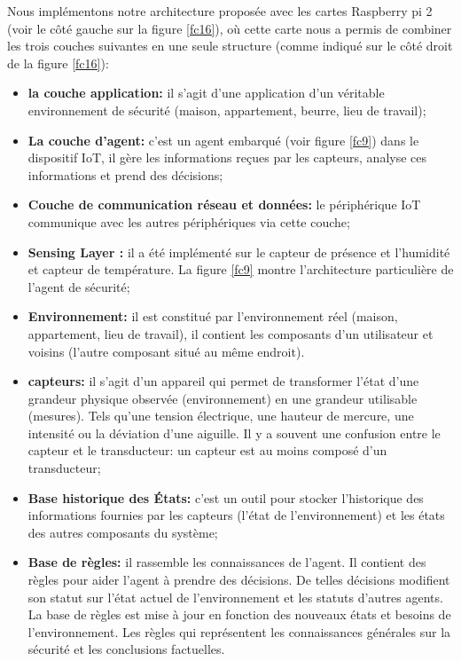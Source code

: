 Nous implémentons notre architecture proposée avec les cartes Raspberry pi 2 (voir le côté gauche sur la figure \ref{fc16}), où cette carte nous a permis de combiner les trois couches suivantes en une seule structure (comme indiqué sur le côté droit de la figure \ref{fc16}):
\begin{itemize}
    \item \textbf{la couche application:} il s'agit d'une application d'un véritable environnement de sécurité (maison, appartement, beurre, lieu de travail);
\item \textbf{	La couche d'agent:} c'est un agent embarqué (voir figure \ref{fc9}) dans le dispositif IoT, il gère les informations reçues par les capteurs, analyse ces informations et prend des décisions;
\item \textbf{Couche de communication réseau et données:} le périphérique IoT communique avec les autres périphériques via cette couche;
\item \textbf{Sensing Layer :} il a été implémenté sur le capteur de présence et l'humidité et capteur de température. La figure \ref{fc9} montre l'architecture particulière de l'agent de sécurité;
\item \textbf{Environnement:} il est constitué par l'environnement réel (maison, appartement, lieu de travail), il contient les composants d'un utilisateur et voisins (l'autre composant situé au même endroit).
\item \textbf{capteurs:} il s'agit d'un appareil qui permet de transformer l'état d'une grandeur physique observée (environnement) en une grandeur utilisable (mesures). Tels qu'une tension électrique, une hauteur de mercure, une intensité ou la déviation d'une aiguille. Il y a souvent une confusion entre le capteur et le transducteur: un capteur est au moins composé d'un transducteur;
\item \textbf{Base historique des États:} c'est un outil pour stocker l'historique des informations fournies par les capteurs (l'état de l'environnement) et les états des autres composants du système;
\item \textbf{Base de règles:} il rassemble les connaissances de l'agent. Il contient des règles pour aider l'agent à prendre des décisions. De telles décisions modifient son statut sur l'état actuel de l'environnement et les statuts d'autres agents. La base de règles est mise à jour en fonction des nouveaux états et besoins de l'environnement. Les règles qui représentent les connaissances générales sur la sécurité et les conclusions factuelles.

\end{itemize}



